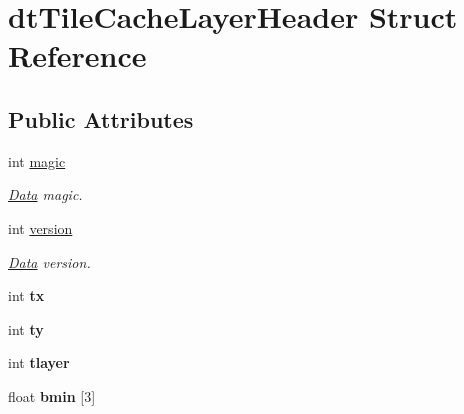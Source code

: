 \hypertarget{structdtTileCacheLayerHeader}{}\section{dt\+Tile\+Cache\+Layer\+Header Struct Reference}
\label{structdtTileCacheLayerHeader}
\subsection*{Public Attributes}
\begin{DoxyCompactItemize}
\item 
\mbox{\label{structdtTileCacheLayerHeader_a8c7b27ed53bf0189ccc94c67d6820e2f}} 
int \hyperlink{structdtTileCacheLayerHeader_a8c7b27ed53bf0189ccc94c67d6820e2f}{magic}
\begin{DoxyCompactList}\small\item\em \hyperlink{classData}{Data} magic. \end{DoxyCompactList}\item 
\mbox{\label{structdtTileCacheLayerHeader_ac568165a80d945c62522408d7f9cdc62}} 
int \hyperlink{structdtTileCacheLayerHeader_ac568165a80d945c62522408d7f9cdc62}{version}
\begin{DoxyCompactList}\small\item\em \hyperlink{classData}{Data} version. \end{DoxyCompactList}\item 
\mbox{\label{structdtTileCacheLayerHeader_a24118e3ecc122ac7685cf9636cced948}} 
int {\bfseries tx}
\item 
\mbox{\label{structdtTileCacheLayerHeader_a020f2fc8488811b19c7d1c70f854bee9}} 
int {\bfseries ty}
\item 
\mbox{\label{structdtTileCacheLayerHeader_a73bd5f743faae4a1c485835d97fb7fc1}} 
int {\bfseries tlayer}
\item 
\mbox{\label{structdtTileCacheLayerHeader_a44557f3ab16db9fafbfce15cbff257f0}} 
float {\bfseries bmin} \mbox{[}3\mbox{]}
\item 
\mbox{\label{structdtTileCacheLayerHeader_a763ed64414bb5a8141aac4318cb44908}} 

\end{DoxyCompactItemize}
